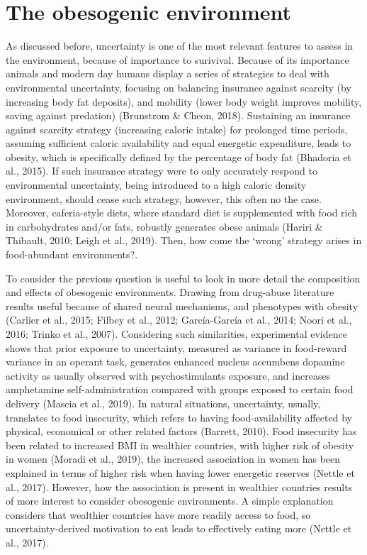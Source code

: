 \documentclass[
]{/home/nicoluarte/Downloads/templates/PNAS-template-main.tex}
\begin{document}
\hypertarget{the-obesogenic-environment}{%
\section{The obesogenic environment}\label{the-obesogenic-environment}}

As discussed before, uncertainty is one of the most relevant features to
assess in the environment, because of importance to surivival. Because
of its importance animals and modern day humans display a series of
strategies to deal with environmental uncertainty, focusing on balancing
insurance against scarcity (by increasing body fat deposits), and
mobility (lower body weight improves mobility, saving against predation)
(Brunstrom \& Cheon, 2018). Sustaining an insurance against scarcity
strategy (increasing caloric intake) for prolonged time periods,
assuming sufficient caloric availability and equal energetic
expenditure, leads to obesity, which is specifically defined by the
percentage of body fat (Bhadoria et al., 2015). If such insurance
strategy were to only accurately respond to environmental uncertainty,
being introduced to a high caloric density environment, should cease
such strategy, however, this often no the case. Moreover, caferia-style
diets, where standard diet is supplemented with food rich in
carbohydrates and/or fats, robustly generates obese animals (Hariri \&
Thibault, 2010; Leigh et al., 2019). Then, how come the `wrong' strategy
arises in food-abundant environments?.

To consider the previous question is useful to look in more detail the
composition and effects of obesogenic environments. Drawing from
drug-abuse literature results useful because of shared neural
mechanisms, and phenotypes with obesity (Carlier et al., 2015; Filbey et
al., 2012; García-García et al., 2014; Noori et al., 2016; Trinko et
al., 2007). Considering such similarities, experimental evidence shows
that prior exposure to uncertainty, measured as variance in food-reward
variance in an operant task, generates enhanced nucleus accumbens
dopamine activity as usually observed with psychostimulants exposure,
and increases amphetamine self-administration compared with groups
exposed to certain food delivery (Mascia et al., 2019). In natural
situations, uncertainty, usually, translates to food insecurity, which
refers to having food-availability affected by physical, economical or
other related factors (Barrett, 2010). Food insecurity has been related
to increased BMI in wealthier countries, with higher risk of obesity in
women (Moradi et al., 2019), the increased association in women has been
explained in terms of higher risk when having lower energetic reserves
(Nettle et al., 2017). However, how the association is present in
wealthier countries results of more interest to consider obesogenic
environments. A simple explanation considers that wealthier countries
have more readily access to food, so uncertainty-derived motivation to
eat leads to effectively eating more (Nettle et al., 2017).
\end{document}

